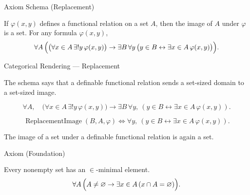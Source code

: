 \begin{axiombox}{Axiom Schema (Replacement)}
\begin{axiom}
\label{ax:replacement}
If $\varphi(x,y)$ defines a functional relation on a set $A$, then the image
of $A$ under $\varphi$ is a set. For any formula $\varphi(x,y)$,
\[
\forall A\,
\Bigl(
\bigl(\forall x \in A\, \exists! y\, \varphi(x,y)\bigr)
\rightarrow
\exists B\, \forall y\,
\bigl(y \in B \leftrightarrow \exists x \in A\, \varphi(x,y)\bigr)
\Bigr).
\]
\end{axiom}
\end{axiombox}

\begin{lracategoricalcard}{Categorical Rendering --- Replacement}
\begin{center}

\end{center}
\smallskip
\noindent\footnotesize
The schema says that a definable functional relation sends a set-sized domain
to a set-sized image.
\end{lracategoricalcard}

\begin{remark*}
\[
  \forall A,\quad
  \bigl(\forall x\in A\,\exists!y\,\varphi(x,y)\bigr)
  \to
  \exists B\,\forall y,\ (y\in B\leftrightarrow \exists x\in A\,\varphi(x,y)).
\]
\end{remark*}

\begin{remark*}
\[
  \operatorname{ReplacementImage}(B,A,\varphi)
  \iff
  \forall y,\ (y\in B\leftrightarrow \exists x\in A\,\varphi(x,y)).
\]
\end{remark*}

\begin{remark*}[Interpretation]
The image of a set under a definable functional relation is again a set.
\end{remark*}

\NoLocalDependencies

\begin{axiombox}{Axiom (Foundation)}
\begin{axiom}
\label{ax:foundation}
Every nonempty set has an $\in$-minimal element.
\[
\forall A \,
\Bigl( A \neq \varnothing \rightarrow
\exists x \in A \, (x \cap A = \varnothing) \Bigr).
\]
\end{axiom}
\end{axiombox}

